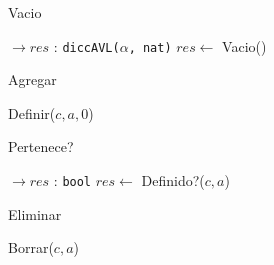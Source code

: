 \begin{Algoritmos}

\begin{algorithm}
\caption{Vacio}
\begin{algorithmic}[1]
$\to res$ : \texttt{diccAVL($\alpha$, nat)}
	\State $res \gets$ Vacio()
\EndProcedure
\end{algorithmic}
\end{algorithm}

\begin{algorithm}
\caption{Agregar}
\begin{algorithmic}[1]
	\State Definir($c, a, 0$)
\EndProcedure
\end{algorithmic}
\end{algorithm}

\begin{algorithm}
\caption{Pertenece?}
\begin{algorithmic}[1]
$\to res$ : \texttt{bool}
	\State $res \gets$ Definido?($c, a$)
\EndProcedure
\end{algorithmic}
\end{algorithm}

\begin{algorithm}
\caption{Eliminar}
\begin{algorithmic}[1]
	\State Borrar($c, a$)
\EndProcedure
\end{algorithmic}
\end{algorithm}
\end{Algoritmos}